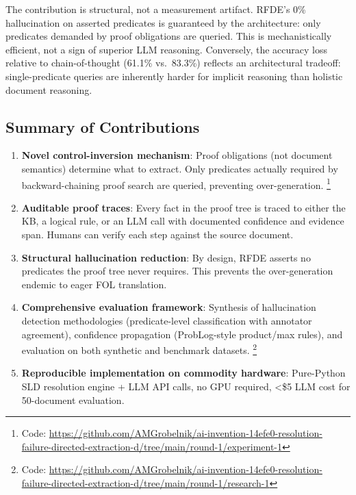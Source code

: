 \documentclass[11pt,letterpaper]{article}
\begin{document}
The contribution is structural, not a measurement artifact. RFDE's 0\% hallucination on asserted predicates is guaranteed by
the architecture: only predicates demanded by proof obligations are queried. This is mechanistically efficient, not a sign of
superior LLM reasoning. Conversely, the accuracy loss relative to chain-of-thought (61.1\% vs.\ 83.3\%) reflects an
architectural tradeoff: single-predicate queries are inherently harder for implicit reasoning than holistic document reasoning.

\subsection{Summary of Contributions}

\begin{enumerate}
  \item \textbf{Novel control-inversion mechanism}: Proof obligations (not document semantics) determine what to extract.
    Only predicates actually required by backward-chaining proof search are queried, preventing over-generation.%
    \footnote{Code: \url{https://github.com/AMGrobelnik/ai-invention-14efe0-resolution-failure-directed-extraction-d/tree/main/round-1/experiment-1}}

  \item \textbf{Auditable proof traces}: Every fact in the proof tree is traced to either the KB, a logical rule, or an LLM
    call with documented confidence and evidence span. Humans can verify each step against the source document.

  \item \textbf{Structural hallucination reduction}: By design, RFDE asserts no predicates the proof tree never requires.
    This prevents the over-generation endemic to eager FOL translation.

  \item \textbf{Comprehensive evaluation framework}: Synthesis of hallucination detection methodologies
    (predicate-level classification with annotator agreement), confidence propagation (ProbLog-style product/max rules), and
    evaluation on both synthetic and benchmark datasets.%
    \footnote{Code: \url{https://github.com/AMGrobelnik/ai-invention-14efe0-resolution-failure-directed-extraction-d/tree/main/round-1/research-1}}

  \item \textbf{Reproducible implementation on commodity hardware}: Pure-Python SLD resolution engine + LLM API calls, no
    GPU required, \textless\$5 LLM cost for 50-document evaluation.
\end{enumerate}
\end{document}
